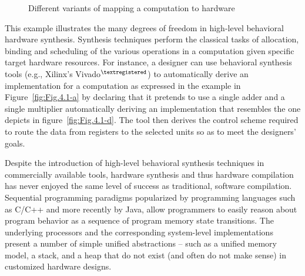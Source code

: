\begin{figure}[htbp]
  \centering
  
  
\caption{Different variants of mapping a computation to hardware} 
\label{fig:Fig.4.1}
\end{figure}

This example illustrates the many degrees of freedom in high-level behavioral hardware synthesis. 
Synthesis techniques perform the classical tasks of allocation, binding and scheduling of the various operations in a computation given specific target hardware resources. 
For instance, a designer can use behavioral synthesis tools (e.g., Xilinx's Vivado$^{\textregistered}$) to automatically derive an implementation for a computation as expressed in the example in Figure~\ref{fig:Fig.4.1-a} by declaring that it pretends to use a single adder and a single multiplier automatically deriving an implementation that resembles the one depicts in figure~\ref{fig:Fig.4.1-d}. 
The tool then derives the control scheme required to route the data from registers to the selected units so as to meet the designers' goals. 

Despite the introduction of high-level behavioral synthesis techniques in commercially available tools, hardware synthesis and thus hardware compilation has never enjoyed the same level of success as traditional, software compilation. 
Sequential programming paradigms popularized by programming languages such as C/C++ and more recently by Java, allow programmers to easily reason about program behavior as a sequence of program memory state transitions. 
The underlying processors and the corresponding system-level implementations present a number of simple unified abstractions -- such as a unified memory model, a stack, and a heap that do not exist (and often do not make sense) in customized hardware designs.

